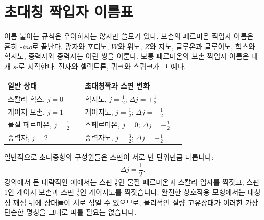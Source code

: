 \begin{classroomqa}\end{classroomqa}

\begin{classroomqa}
\end{classroomqa}

\section{초대칭 짝입자 이름표}

이름 붙이는 규칙은 우아하지는 않지만 쓸모가 있다. 보손의 페르미온 짝입자 이름은 흔히 \emph{-ino}로 끝난다. 광자와 포티노, \(W\)와 위노, \(Z\)와 지노, 글루온과 글루이노, 힉스와 힉시노, 중력자와 중력자는 이런 쌍을 이룬다. 보통 페르미온의 보손 짝입자 이름은 대개 \emph{s-}로 시작한다. 전자와 셀렉트론, 쿼크와 스쿼크가 그 예다.

\begin{center}
\begin{tabular}{@{}>{\raggedright\arraybackslash}p{0.40\linewidth}>{\raggedright\arraybackslash}p{0.52\linewidth}@{}}
\toprule
일반 상태 & 초대칭짝과 스핀 변화\\
\midrule
스칼라 힉스, \(j=0\) & 힉시노, \(j=\tfrac12\); \(\Delta j=+\tfrac12\)\\
게이지 보손, \(j=1\) & 게이지노, \(j=\tfrac12\); \(\Delta j=-\tfrac12\)\\
물질 페르미온, \(j=\tfrac12\) & 스페르미온, \(j=0\); \(\Delta j=-\tfrac12\)\\
중력자, \(j=2\) & 중력자노, \(j=\tfrac32\); \(\Delta j=-\tfrac12\)\\
\bottomrule
\end{tabular}
\end{center}

일반적으로 초다중항의 구성원들은 스핀이 서로 반 단위만큼 다릅니다:
\begin{equation}
\Delta j=\frac12.
\end{equation}
강의에서 든 대략적인 예에서는 스핀 \(\tfrac12\)인 물질 페르미온과 스칼라 입자를 짝짓고, 스핀 1인 게이지 보손과 스핀 \(\tfrac12\)인 게이지노를 짝짓습니다. 완전한 상호작용 모형에서는 대칭성 깨짐 뒤에 상태들이 서로 섞일 수 있으므로, 물리적인 질량 고유상태가 이러한 가장 단순한 명칭을 그대로 따를 필요는 없습니다.

